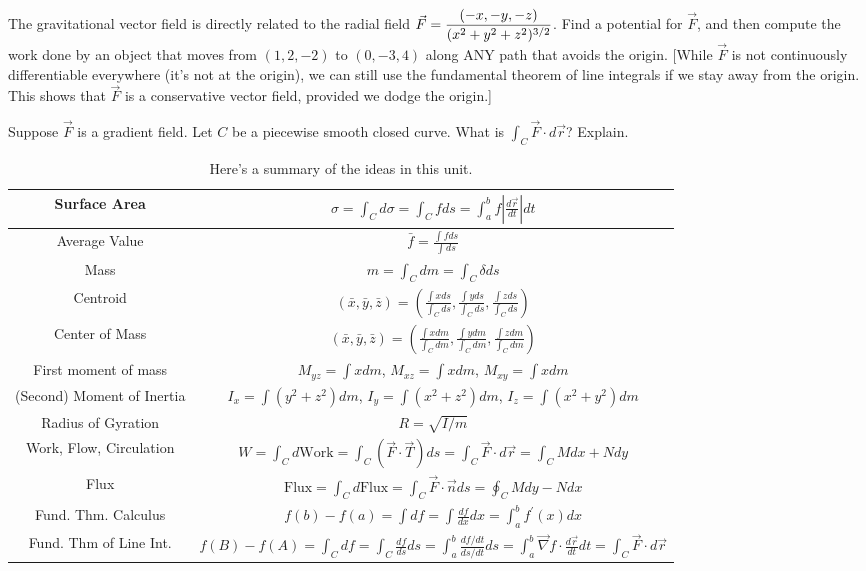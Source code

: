 \begin{problem}
 The gravitational vector field is directly related to the radial field $\displaystyle\vec F = \frac{\left(-x,-y,-z\right)}{(x^2+y^2+z^2)^{3/2}}$. Find a potential for $\vec F$, and then compute the work done by an object that moves from $(1,2,-2)$ to $(0,-3,4)$ along ANY path that avoids the origin. [While $\vec F$ is not continuously differentiable everywhere (it's not at the origin), we can still use the fundamental theorem of line integrals if we stay away from the origin. This shows that $\vec F$ is a conservative vector field, provided we dodge the origin.]
\end{problem}

\begin{problem}
 Suppose $\vec F$ is a gradient field.  Let $C$ be a piecewise smooth closed curve. What is $\int_C \vec F\cdot d\vec r$? Explain.
\end{problem}



\begin{table}
 \begin{center}
\begin{tabular}{|c|c|}
 \hline
 Surface Area& 
     $\sigma = \int_C d\sigma=\int_C f ds = \int_a^b f \left|\frac{d\vec r}{dt}\right|dt$\\
 \hline
 Average Value& 
     $\bar f = \frac{\int f ds}{\int ds}$\\
 \hline
 Mass& 
     $m=\int_C dm = \int_C \delta ds $\\
 \hline
 Centroid& 
     $\left(\bar x,\bar y,\bar z\right) =\left(\frac{\int x ds}{\int_C ds},\frac{\int y ds}{\int_C ds},\frac{\int z ds}{\int_C ds}\right)$\\
 \hline
 Center of Mass & 
     $\left(\bar x,\bar y,\bar z\right) =\left(\frac{\int x dm}{\int_C dm},\frac{\int y dm}{\int_C dm},\frac{\int z dm}{\int_C dm}\right)$\\
 \hline
 First moment of mass & 
     $M_{yz}=\int x dm$, $M_{xz} = \int x dm$, $M_{xy}=\int x dm$\\
 \hline
 (Second) Moment of Inertia & 
     $I_x = \int (y^2+z^2) dm$, $I_y = \int (x^2+z^2) dm$, $I_z = \int (x^2+y^2) dm$ \\
 \hline
 Radius of Gyration &
     $R = \sqrt{I/m}$\\
 \hline
 Work, Flow, Circulation &
     $W=\int_C d\text{Work} = \int_C (\vec F\cdot \vec T) ds = \int_C \vec F\cdot d\vec r = \int_C Mdx+Ndy$\\
 \hline
 Flux & 
     $\text{Flux} = \int_C d\text{Flux} = \int_C \vec F\cdot \vec n ds = \oint_C Mdy-Ndx$\\
 \hline
 Fund. Thm. Calculus & 
     $f(b)-f(a)=\int df = \int \frac{df}{dx}dx = \int_a^b f^\prime(x)dx$\\
 \hline
 Fund. Thm of Line Int. &
    $f(B)-f(A)=\int_C df = \int_C \frac{df}{ds}ds = \int_a^b \frac{df/dt}{ds/dt}ds = \int_a^b \vec \nabla f \cdot \frac{d\vec r}{dt}dt = \int_C \vec F \cdot d \vec r$\\
\hline
\end{tabular}
\caption{Here's a summary of the ideas in this unit.\label{line integral summary}}
\end{center}
\end{table}

